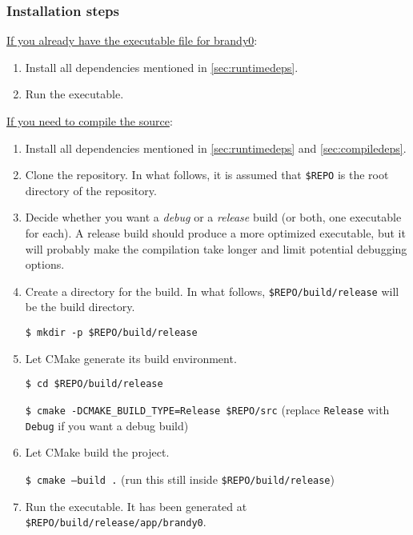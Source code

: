 \documentclass{article}
\newcommand{\icd}[1]{\texttt{#1}}
\newcommand{\ccd}[1]{\colorbox{gray!15!white}{\texttt{#1}}}
\newcommand{\scd}[1]{
	\vspace*{5pt}

	\ccd{#1}
	\vspace*{5pt}
}
\newcommand{\nscd}[1]{\scd{\$ #1}}
\newcommand{\pname}{brandy0}
\begin{document}
\subsubsection{Installation steps}
\underline{If you already have the executable file for \pname{}}:
\begin{enumerate}
	\item
		Install all dependencies mentioned in \ref{sec:runtimedeps}.
	\item
		Run the executable.
\end{enumerate}
\underline{If you need to compile the source}:
\begin{enumerate}
	\item
		Install all dependencies mentioned in \ref{sec:runtimedeps} and \ref{sec:compiledeps}.
	\item
		Clone the repository. In what follows, it is assumed that \icd{\$REPO} is the root directory of the repository.
	\item
		Decide whether you want a \emph{debug} or a \emph{release} build (or both, one executable for each). A release build should produce a more optimized executable, but it will probably make the compilation take longer and limit potential debugging options.
	\item
		Create a directory for the build. In what follows, \icd{\$REPO/build/release} will be the build directory.
		\nscd{mkdir -p \$REPO/build/release}
	\item
		Let CMake generate its build environment.
		\nscd{cd \$REPO/build/release}
		\nscd{cmake -DCMAKE\_BUILD\_TYPE=Release \$REPO/src} (replace \icd{Release} with \icd{Debug} if you want a debug build)
	\item
		Let CMake build the project.
		\nscd{cmake --build .} (run this still inside \icd{\$REPO/build/release})
	\item
		Run the executable. It has been generated at \icd{\$REPO/build/release/app/brandy0}.
\end{enumerate}

\newcommand{\inull}{start interface}
\newcommand{\Inull}{Start Interface}
\newcommand{\ione}{configuration interface}
\newcommand{\Ione}{Configuration Interface}
\newcommand{\itwo}{simulation interface}
\newcommand{\Itwo}{Simulation Interface}
\newcommand{\iexv}{video export interface}
\newcommand{\Iexv}{Video Export Interface}
\end{document}
